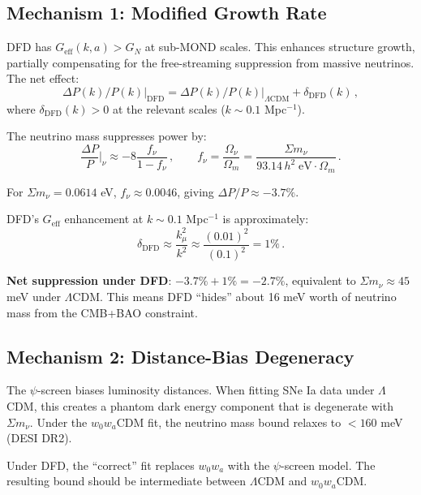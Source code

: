 \documentclass[11pt,a4paper]{article}
\begin{document}
\subsection{Mechanism 1: Modified Growth Rate}

DFD has $G_{\mathrm{eff}}(k, a) > G_N$ at sub-MOND scales. This enhances structure growth, partially compensating for the free-streaming suppression from massive neutrinos. The net effect:
\begin{equation}
\Delta P(k)/P(k)\big|_{\mathrm{DFD}} = \Delta P(k)/P(k)\big|_{\Lambda\mathrm{CDM}} + \delta_{\mathrm{DFD}}(k)\,,
\end{equation}
where $\delta_{\mathrm{DFD}}(k) > 0$ at the relevant scales ($k \sim 0.1$ Mpc$^{-1}$).

The neutrino mass suppresses power by:
\begin{equation}
\frac{\Delta P}{P}\bigg|_{\nu} \approx -8\frac{f_\nu}{1-f_\nu}\,,\qquad f_\nu = \frac{\Omega_\nu}{\Omega_m} = \frac{\Sigma m_\nu}{93.14\,h^2\;\mathrm{eV} \cdot \Omega_m}\,.
\end{equation}

For $\Sigma m_\nu = 0.0614$ eV, $f_\nu \approx 0.0046$, giving $\Delta P/P \approx -3.7\%$.

DFD's $G_{\mathrm{eff}}$ enhancement at $k \sim 0.1$ Mpc$^{-1}$ is approximately:
\begin{equation}
\delta_{\mathrm{DFD}} \approx \frac{k_\mu^2}{k^2} \approx \frac{(0.01)^2}{(0.1)^2} = 1\%\,.
\end{equation}

\textbf{Net suppression under DFD}: $-3.7\% + 1\% = -2.7\%$, equivalent to $\Sigma m_\nu \approx 45$ meV under $\Lambda$CDM. This means DFD ``hides'' about 16 meV worth of neutrino mass from the CMB+BAO constraint.

\subsection{Mechanism 2: Distance-Bias Degeneracy}

The $\psi$-screen biases luminosity distances. When fitting SNe Ia data under $\Lambda$CDM, this creates a phantom dark energy component that is degenerate with $\Sigma m_\nu$. Under the $w_0w_a$CDM fit, the neutrino mass bound relaxes to $< 160$ meV (DESI DR2).

Under DFD, the ``correct'' fit replaces $w_0w_a$ with the $\psi$-screen model. The resulting bound should be intermediate between $\Lambda$CDM and $w_0w_a$CDM.
\end{document}
